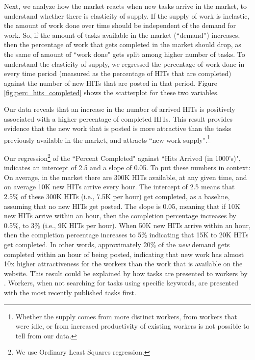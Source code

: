Next, we  analyze how the market reacts when new tasks arrive in the
market, to understand whether there is elasticity of supply. If the
supply of work is inelastic, the amount of work done over time should
be independent of the demand for work. So, if the amount of tasks
available in the market (``demand'') increases, then the percentage of
work that gets completed in the market should drop, as the same of
amount of ``work done" gets split among higher number of tasks. To
understand the elasticity of supply, we regressed the percentage of
work done in every time period (measured as the percentage of HITs
that are completed) against the number of new HITs that are posted in
that period. Figure \ref{fig:perc_hits_completed} shows the scatterplot for these two variables.

Our data reveals that an increase in the number of arrived HITs is
positively associated with a higher percentage of completed HITs. This
result provides evidence that the new work that is posted is more
attractive than the tasks previously available in the market, and attracts ``new
work supply".\footnote{Whether the supply comes from more distinct
workers, from workers that were idle, or from increased productivity
of existing workers is not possible to tell from our data.}

Our regression\footnote{We use Ordinary Least Squares regression.} of the ``Percent Completed" against ``Hits Arrived (in
1000's)", indicates an intercept of 2.5 and a slope of 0.05. To put
these numbers in context: On average, in the market there are 300K
HITs available, at any given time, and on average 10K new HITs arrive
every hour. The intercept of 2.5 means that 2.5\% of these 300K HITs
(i.e., 7.5K per hour) get completed, as a baseline, assuming that no
new HITs get posted. The slope is 0.05, meaning that if 10K new HITs
arrive within an hour, then the completion percentage increases by
0.5\%, to 3\% (i.e., 9K HITs per hour). When 50K new HITs arrive within
an hour, then the completion percentage increases to 5\% indicating
that 15K to 20K HITs get completed. In other words, approximately 20\%
of the \emph{new} demand gets completed within an hour of being posted,
indicating that new work has almost 10x higher attractiveness for the
workers than the work that is available on the website.
% 
This result could be explained by how tasks are presented to workers by \amt{}.
Workers, when not searching for tasks using specific keywords, are presented with the most recently published tasks first.

